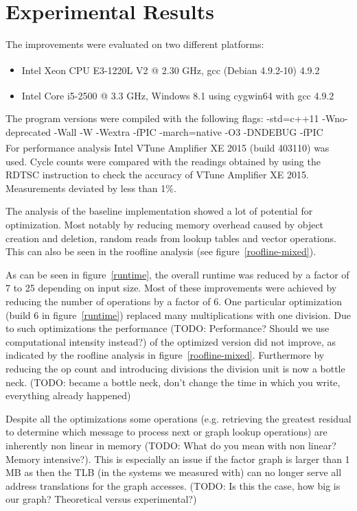 \section{Experimental Results}\label{sec:results}

 The improvements were evaluated on two different platforms:
\begin{itemize}
\item Intel\textsuperscript{\textregistered} Xeon CPU E3-1220L V2 @ 2.30 GHz, gcc (Debian 4.9.2-10) 4.9.2
\item Intel\textsuperscript{\textregistered} Core i5-2500 @ 3.3 GHz, Windows 8.1 using cygwin64 with gcc 4.9.2
\end{itemize}

The program versions were compiled with the following flags: 
-std=c++11 -Wno-deprecated -Wall -W -Wextra -fPIC -march=native -O3 -DNDEBUG -fPIC
\\
For performance analysis Intel\textsuperscript{\textregistered} VTune Amplifier XE 2015 (build 403110) was used. Cycle counts were compared with the readings obtained by using the RDTSC instruction to check the accuracy of VTune Amplifier XE 2015. Measurements deviated by less than 1\%.

The analysis of the baseline implementation showed a lot of potential for optimization. Most notably by reducing memory overhead caused by object creation and deletion, random reads from lookup tables and vector operations. This can also be seen in the roofline analysis \cite{Ofenbeck:14} (see figure~\ref{roofline-mixed}).

As can be seen in figure~\ref{runtime}, the overall runtime was reduced by a factor of 7 to 25 depending on input size. Most of these improvements were achieved by reducing the number of operations by a factor of 6. One particular optimization (build 6 in figure~\ref{runtime}) replaced many multiplications with one division. Due to such optimizations the performance (TODO: Performance? Should we use computational intensity instead?) of the optimized version did not improve, as indicated by the roofline analysis in figure~\ref{roofline-mixed}. Furthermore by reducing the op count and introducing divisions the division unit is now a bottle neck. (TODO: became a bottle neck, don't change the time in which you write, everything already happened)

Despite all the optimizations some operations (e.g. retrieving the greatest residual to determine which message to process next or graph lookup operations) are inherently non linear in memory (TODO: What do you mean with non linear? Memory intensive?). This is especially an issue if the factor graph is larger than 1 MB as then the TLB (in the systems we measured with) can no longer serve all address translations for the graph accesses. (TODO: Is this the case, how big is our graph? Theoretical versus experimental?)

